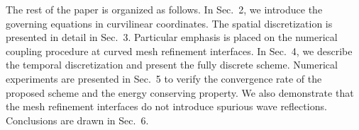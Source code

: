 The rest of the paper is organized as follows. In Sec.~2, we introduce the governing equations in curvilinear coordinates. The spatial discretization is presented in detail in Sec.~3. Particular emphasis is placed on the numerical coupling procedure at curved mesh refinement interfaces. In Sec.~4, we describe the temporal discretization and present the fully discrete scheme. Numerical experiments are presented in Sec.~5 to verify the convergence rate of the proposed scheme and the energy conserving property. We also demonstrate that the mesh refinement interfaces do not introduce spurious wave reflections. Conclusions are drawn in Sec.~6. 
